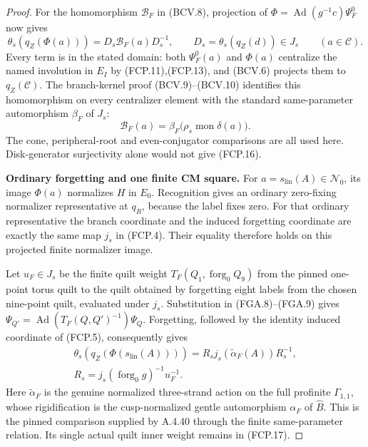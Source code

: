 \begin{proof}
For the homomorphism $\mathcal B_F$ in (BCV.8), projection
of $\Phi=\operatorname{Ad}(g^{-1}c)\Psi_F^0$ now gives
\[
 \theta_s(q_Z(\Phi(a)))=D_s\mathcal B_F(a)D_s^{-1},
 \qquad D_s=\theta_s(q_Z(d))\in J_s\qquad(a\in\mathcal C).
                                                               \tag{FCP.15}
\]
Every term is in the stated domain: both $\Psi_F^0(a)$
and $\Phi(a)$ centralize the named involution in $E_I$
by (FCP.11),(FCP.13), and (BCV.6) projects them to
$q_Z(\mathcal C)$.
The branch-kernel proof (BCV.9)--(BCV.10) identifies
this homomorphism on every centralizer element with the
standard same-parameter automorphism $\beta_F$ of $J_s$:
\[
       \mathcal B_F(a)=
          \beta_F\bigl(\rho_s\operatorname{mon}\delta(a)\bigr).
                                                               \tag{FCP.16}
\]
The cone, peripheral-root and even-conjugator comparisons
are all used here.  Disk-generator surjectivity alone
would not give (FCP.16).

\par\medskip\noindent\textbf{Ordinary forgetting and one finite CM square.}\quad
For $a=s_{\mathrm{lin}}(A)\in\mathcal N_0$, its image
$\Phi(a)$ normalizes $H$ in $E_0$.
Recognition gives an ordinary zero-fixing normalizer
representative at $q_R$, because the label fixes zero.
For that ordinary representative the branch coordinate
and the induced forgetting coordinate are exactly the
same map $j_s$ in (FCP.4).  Their equality therefore
holds on this projected finite normalizer image.

Let $u_F\in J_s$ be the finite quilt weight
$T_F(Q_1,\operatorname{forg}_0Q_9)$ from the pinned
one-point torus quilt to the quilt obtained by forgetting
eight labels from the chosen nine-point quilt, evaluated
under $j_s$.  Substitution in (FGA.8)--(FGA.9) gives
$\Psi_{Q'}=\operatorname{Ad}(T_F(Q,Q')^{-1})\Psi_Q$.
Forgetting, followed by the identity induced coordinate
of (FCP.5), consequently gives
\[
 \begin{gathered}
 \theta_s(q_Z(\Phi(s_{\mathrm{lin}}(A))))
           =R_s j_s(\widetilde\alpha_F(A))R_s^{-1},\\
 R_s=j_s(\operatorname{forg}_0g)^{-1}u_F^{-1}.
 \end{gathered}                                                   \tag{FCP.17}
\]
Here $\widetilde\alpha_F$ is the genuine normalized
three-strand action on the full profinite $\Gamma_{1,1}$,
whose rigidification is the cusp-normalized gentle
automorphism $\alpha_F$ of $\widehat B$.
This is the pinned comparison supplied by A.4.40 through
the finite same-parameter relation.  Its single actual
quilt inner weight remains in (FCP.17).


\end{proof}
